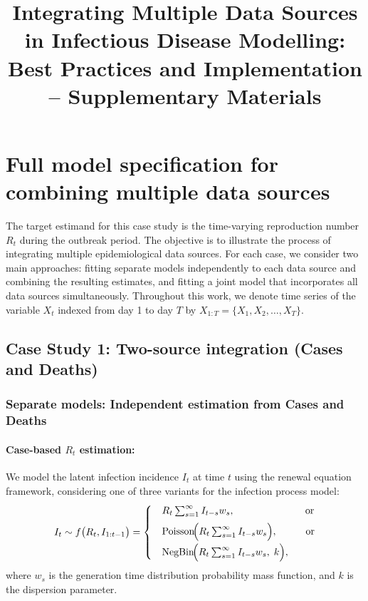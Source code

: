 \documentclass{article}
\title{Integrating Multiple Data Sources in Infectious Disease Modelling: Best Practices and Implementation -- Supplementary Materials}
\author{}
\date{}
\newcommand{\beginsupplement}{%
        \setcounter{section}{0}
        \renewcommand{\thesection}{S\arabic{section}}%
        \setcounter{table}{0}
        \renewcommand{\thetable}{S\arabic{table}}%
        \setcounter{figure}{0}
        \renewcommand{\thefigure}{S\arabic{figure}}%
     }
\begin{document}
\maketitle

\beginsupplement

\section{Full model specification for combining multiple data sources}
The target estimand for this case study is the time-varying reproduction number $R_t$ during the outbreak period. The objective is to illustrate the process of integrating multiple epidemiological data sources. For each case, we consider two main approaches: fitting separate models independently to each data source and combining the resulting estimates, and fitting a joint model that incorporates all data sources simultaneously. Throughout this work, we denote time series of the variable $X_t$ indexed from day 1 to day $T$ by $X_{1:T} = \{X_1, X_2, \ldots, X_T\}$.


\subsection{Case Study 1: Two-source integration (Cases and Deaths)}

\subsubsection{Separate models: Independent estimation from Cases and Deaths}

\paragraph{Case-based $R_{t}$ estimation:}
We model the latent infection incidence $I_{t}$ at time $t$ using the renewal equation framework, considering one of three variants for the infection process model:
\begin{align}\label{latent_inf}
I_t \sim f\big(R_t, I_{1:t-1}\big) =
\begin{cases} 
 & R_t \sum_{s=1}^\infty I_{t-s} w_s, \hspace{2.5cm}\text{or}\\[5pt]
 & \mathrm{Poisson}\!\Big(R_t \sum_{s=1}^\infty I_{t-s} w_s\Big), \hspace{1cm}\text{or}\\[5pt]
 & \mathrm{NegBin}\!\Big(R_t \sum_{s=1}^\infty I_{t-s} w_s,\; k\Big),
\end{cases}
\end{align}
where $w_s$ is the generation time distribution probability mass function, and $k$ is the dispersion parameter.
\end{document}
